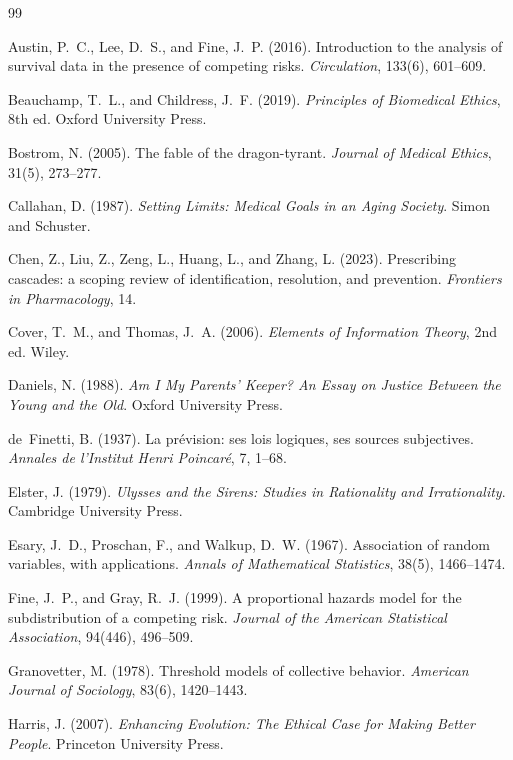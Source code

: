 \documentclass[11pt]{article}
\theoremstyle{plain}
\theoremstyle{definition}
\theoremstyle{remark}
\begin{document}
\begin{thebibliography}{99}\small
\setlength{\itemsep}{0.2em}

 Austin, P.~C., Lee, D.~S., and Fine, J.~P. (2016). Introduction to the analysis of survival data in the presence of competing risks. \emph{Circulation}, 133(6), 601--609.

 Beauchamp, T.~L., and Childress, J.~F. (2019). \emph{Principles of Biomedical Ethics}, 8th ed. Oxford University Press.

 Bostrom, N. (2005). The fable of the dragon-tyrant. \emph{Journal of Medical Ethics}, 31(5), 273--277.

 Callahan, D. (1987). \emph{Setting Limits: Medical Goals in an Aging Society}. Simon and Schuster.

 Chen, Z., Liu, Z., Zeng, L., Huang, L., and Zhang, L. (2023). Prescribing cascades: a scoping review of identification, resolution, and prevention. \emph{Frontiers in Pharmacology}, 14.

 Cover, T.~M., and Thomas, J.~A. (2006). \emph{Elements of Information Theory}, 2nd ed. Wiley.

 Daniels, N. (1988). \emph{Am I My Parents' Keeper? An Essay on Justice Between the Young and the Old}. Oxford University Press.

 de~Finetti, B. (1937). La pr\'evision: ses lois logiques, ses sources subjectives. \emph{Annales de l'Institut Henri Poincar\'e}, 7, 1--68.

 Elster, J. (1979). \emph{Ulysses and the Sirens: Studies in Rationality and Irrationality}. Cambridge University Press.

 Esary, J.~D., Proschan, F., and Walkup, D.~W. (1967). Association of random variables, with applications. \emph{Annals of Mathematical Statistics}, 38(5), 1466--1474.

 Fine, J.~P., and Gray, R.~J. (1999). A proportional hazards model for the subdistribution of a competing risk. \emph{Journal of the American Statistical Association}, 94(446), 496--509.

 Granovetter, M. (1978). Threshold models of collective behavior. \emph{American Journal of Sociology}, 83(6), 1420--1443.

 Harris, J. (2007). \emph{Enhancing Evolution: The Ethical Case for Making Better People}. Princeton University Press.


\end{thebibliography}
\end{document}
